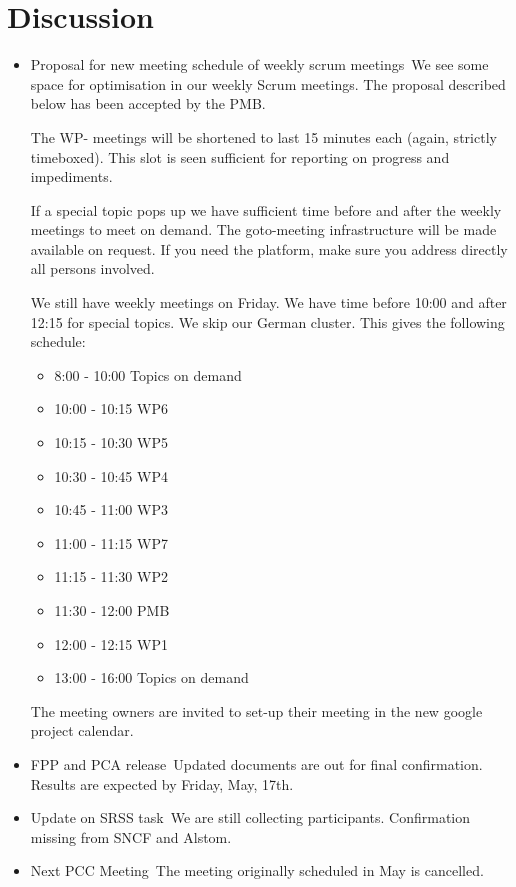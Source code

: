 \documentclass[a4paper, 11pt]{article}
\begin{document}
\section{Discussion}
\begin{itemize}
\item Proposal for new meeting schedule of weekly scrum meetings\
We see some space for optimisation in our weekly Scrum meetings. The proposal described below has been accepted by the PMB.

The WP- meetings will be shortened to last 15 minutes each (again, strictly timeboxed). This slot is seen sufficient for reporting on progress and impediments. 

If a special topic pops up we have sufficient time before and after the weekly meetings to meet on demand. The goto-meeting infrastructure will be made available on request. If you need the platform, make sure you address directly all persons involved.

We still have weekly meetings on Friday. We have time before 10:00 and after 12:15 for special topics.
We skip our German cluster. This gives the following schedule:
\begin{itemize}
\item 8:00 - 10:00	Topics on demand
\item 10:00 - 10:15	WP6
\item 10:15 - 10:30	WP5
\item 10:30 - 10:45	WP4
\item 10:45 - 11:00	WP3
\item 11:00 - 11:15	WP7
\item 11:15 - 11:30	WP2
\item 11:30 - 12:00	PMB
\item 12:00 - 12:15	WP1
\item 13:00 - 16:00	Topics on demand
\end{itemize}
The meeting owners are invited to set-up their meeting in the new google project calendar.

\item FPP and PCA release\
Updated documents are out for final confirmation. Results are expected by Friday, May, 17th.

\item Update on SRSS task\
We are still collecting participants. Confirmation missing from SNCF and Alstom.

\item Next PCC Meeting\
The meeting originally scheduled in May is cancelled.


\end{itemize}
\end{document}
